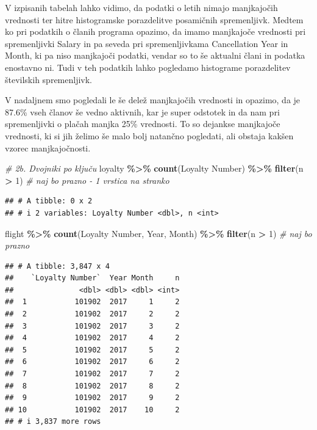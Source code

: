 \documentclass[
]{article}
\newenvironment{Shaded}{\begin{snugshade}}{\end{snugshade}}
\newcommand{\AttributeTok}[1]{\textcolor[rgb]{0.13,0.29,0.53}{#1}}
\newcommand{\CommentTok}[1]{\textcolor[rgb]{0.56,0.35,0.01}{\textit{#1}}}
\newcommand{\DecValTok}[1]{\textcolor[rgb]{0.00,0.00,0.81}{#1}}
\newcommand{\FunctionTok}[1]{\textcolor[rgb]{0.13,0.29,0.53}{\textbf{#1}}}
\newcommand{\NormalTok}[1]{#1}
\newcommand{\SpecialCharTok}[1]{\textcolor[rgb]{0.81,0.36,0.00}{\textbf{#1}}}
\newcommand{\StringTok}[1]{\textcolor[rgb]{0.31,0.60,0.02}{#1}}
\begin{document}
V izpisanih tabelah lahko vidimo, da podatki o letih nimajo manjkajočih
vrednosti ter hitre histogramske porazdelitve posamičnih spremenljivk.
Medtem ko pri podatkih o članih programa opazimo, da imamo manjkajoče
vrednosti pri spremenljivki Salary in pa seveda pri spremenljivkama
Cancellation Year in Month, ki pa niso manjkajoči podatki, vendar so to
še aktualni člani in podatka enostavno ni. Tudi v teh podatkih lahko
pogledamo histograme porazdelitev številskih spremenljivk.

V nadaljnem smo pogledali le še delež manjkajočih vrednosti in opazimo,
da je 87.6\% vseh članov še vedno aktivnih, kar je super odstotek in da
nam pri spremenljivki o plačah manjka 25\% vrednosti. To so dejankse
manjkajoče vrednosti, ki si jih želimo še malo bolj natančno pogledati,
ali obstaja kakšen vzorec manjkajočnosti.

\begin{Shaded}
\begin{Highlighting}[]
\CommentTok{\# 2b. Dvojniki po ključu}
\NormalTok{loyalty }\SpecialCharTok{\%\textgreater{}\%} \FunctionTok{count}\NormalTok{(}\StringTok{\textasciigrave{}}\AttributeTok{Loyalty Number}\StringTok{\textasciigrave{}}\NormalTok{) }\SpecialCharTok{\%\textgreater{}\%} \FunctionTok{filter}\NormalTok{(n }\SpecialCharTok{\textgreater{}} \DecValTok{1}\NormalTok{) }\CommentTok{\# naj bo prazno {-} 1 vrstica na stranko}
\end{Highlighting}
\end{Shaded}

\begin{verbatim}
## # A tibble: 0 x 2
## # i 2 variables: Loyalty Number <dbl>, n <int>
\end{verbatim}

\begin{Shaded}
\begin{Highlighting}[]
\NormalTok{flight  }\SpecialCharTok{\%\textgreater{}\%} \FunctionTok{count}\NormalTok{(}\StringTok{\textasciigrave{}}\AttributeTok{Loyalty Number}\StringTok{\textasciigrave{}}\NormalTok{, Year, Month) }\SpecialCharTok{\%\textgreater{}\%} \FunctionTok{filter}\NormalTok{(n }\SpecialCharTok{\textgreater{}} \DecValTok{1}\NormalTok{) }\CommentTok{\# naj bo prazno}
\end{Highlighting}
\end{Shaded}

\begin{verbatim}
## # A tibble: 3,847 x 4
##    `Loyalty Number`  Year Month     n
##               <dbl> <dbl> <dbl> <int>
##  1           101902  2017     1     2
##  2           101902  2017     2     2
##  3           101902  2017     3     2
##  4           101902  2017     4     2
##  5           101902  2017     5     2
##  6           101902  2017     6     2
##  7           101902  2017     7     2
##  8           101902  2017     8     2
##  9           101902  2017     9     2
## 10           101902  2017    10     2
## # i 3,837 more rows
\end{verbatim}
\end{document}
